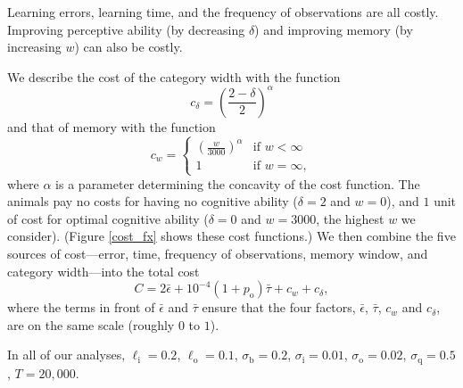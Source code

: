 Learning errors, learning time, and the frequency of observations are all costly. 
Improving  perceptive ability (by decreasing $\delta$) and improving memory (by increasing $w$) can also be costly. 

We describe the cost of the category width with the function
\begin{equation*}
c_\delta = \left(\frac{2-\delta}{2}\right)^\alpha
\end{equation*}
and that of memory with the function
\begin{equation*}
c_w = \left\{\begin{array}{lll}\left(\frac{w}{3000}\right)^\alpha & \text{if } w<\infty
\\ 1 & \text{if } w=\infty, \end{array}\right.
\end{equation*}
where $\alpha$ is a parameter determining the concavity of the cost function. The animals pay no costs for having no cognitive ability ($\delta=2$ and $w=0$), and $1$ unit of cost for optimal cognitive ability ($\delta=0$ and $w=3000$, the highest $w$ we consider). (Figure \ref{cost_fx} shows these cost functions.)
We then combine the five sources of cost---error, time, frequency of observations, memory window, and category width---into the total cost 
\begin{equation*}
C = 2\bar{\epsilon}+10^{-4}(1+p_\text{o})\bar{\tau}+c_w+c_\delta,
\end{equation*}
where the terms in front of $\bar{\epsilon}$ and $\bar{\tau}$ ensure that the four factors, $\bar{\epsilon}$, $\bar{\tau}$, $c_w$ and $c_\delta$, are on the same scale (roughly $0$ to $1$). 

In all of our analyses, $\ell_\text{i}=0.2$, $\ell_\text{o}=0.1$, $\sigma_\text{b}=0.2$, $\sigma_\text{i}=0.01$, $\sigma_\text{o}=0.02$, $\sigma_\text{q}=0.5$, $T=20,000$.


